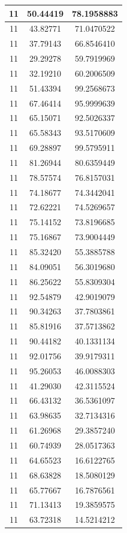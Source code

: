 \documentclass[
]{book}
\begin{document}
\begin{tabular}{c|c|c}
\hline
11 & 50.44419 & 78.1958883\\
\hline
11 & 43.82771 & 71.0470522\\
\hline
11 & 37.79143 & 66.8546410\\
\hline
11 & 29.29278 & 59.7919969\\
\hline
11 & 32.19210 & 60.2006509\\
\hline
11 & 51.43394 & 99.2568673\\
\hline
11 & 67.46414 & 95.9999639\\
\hline
11 & 65.15071 & 92.5026337\\
\hline
11 & 65.58343 & 93.5170609\\
\hline
11 & 69.28897 & 99.5795911\\
\hline
11 & 81.26944 & 80.6359449\\
\hline
11 & 78.57574 & 76.8157031\\
\hline
11 & 74.18677 & 74.3442041\\
\hline
11 & 72.62221 & 74.5269657\\
\hline
11 & 75.14152 & 73.8196685\\
\hline
11 & 75.16867 & 73.9004449\\
\hline
11 & 85.32420 & 55.3885788\\
\hline
11 & 84.09051 & 56.3019680\\
\hline
11 & 86.25622 & 55.8309304\\
\hline
11 & 92.54879 & 42.9019079\\
\hline
11 & 90.34263 & 37.7803861\\
\hline
11 & 85.81916 & 37.5713862\\
\hline
11 & 90.44182 & 40.1331134\\
\hline
11 & 92.01756 & 39.9179311\\
\hline
11 & 95.26053 & 46.0088303\\
\hline
11 & 41.29030 & 42.3115524\\
\hline
11 & 66.43132 & 36.5361097\\
\hline
11 & 63.98635 & 32.7134316\\
\hline
11 & 61.26968 & 29.3857240\\
\hline
11 & 60.74939 & 28.0517363\\
\hline
11 & 64.65523 & 16.6122765\\
\hline
11 & 68.63828 & 18.5080129\\
\hline
11 & 65.77667 & 16.7876561\\
\hline
11 & 71.13413 & 19.3859575\\
\hline
11 & 63.72318 & 14.5214212\\

\end{tabular}
\end{document}
